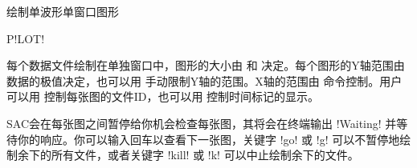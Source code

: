 \label{cmd:plot}

绘制单波形单窗口图形

\begin{SACSTX}
P!LOT!
\end{SACSTX}

每个数据文件绘制在单独窗口中，图形的大小由  和
 决定。每个图形的Y轴范围由数据的极值决定，也可以用
 手动限制Y轴的范围。X轴的范围由 
命令控制。用户可以用  控制每张图的文件ID，也可以用
 控制时间标记的显示。

SAC会在每张图之间暂停给你机会检查每张图，其将会在终端输出 !Waiting!
并等待你的响应。你可以输入回车以查看下一张图，关键字 !go! 或
!g! 可以不暂停地绘制余下的所有文件，或者关键字 !kill! 或
!k! 可以中止绘制余下的文件。
